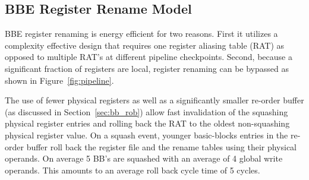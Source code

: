 \subsection{BBE Register Rename Model}
\label{sec:bb_reg_ren}

BBE register renaming is energy efficient for two reasons. First it utilizes a
complexity effective design that requires one register aliasing table (RAT) as
opposed to multiple RAT's at different pipeline checkpoints.  Second, because a
significant fraction of registers are local, register renaming can be bypassed
as shown in Figure~\ref{fig:pipeline}.

The use of fewer physical registers as well as a significantly smaller re-order
buffer (as discussed in Section~\ref{sec:bb_rob}) allow fast invalidation
of the squashing physical register entries and rolling back the RAT to the
oldest non-squashing physical register value. On a squash event, younger
basic-blocks entries in the re-order buffer roll back the register file and the
rename tables using their physical operands. On average 5 BB's are squashed with
an average of 4 global write operands. This amounts to an average roll back cycle
time of 5 cycles. 
